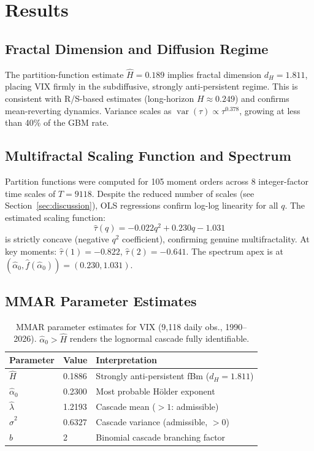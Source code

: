 \documentclass[12pt,a4paper]{article}
\begin{document}
\section{Results}

\subsection{Fractal Dimension and Diffusion Regime}

The partition-function estimate $\hat{H} = 0.189$ implies fractal
dimension $d_H = 1.811$, placing VIX firmly in the subdiffusive,
strongly anti-persistent regime. This is consistent with R/S-based
estimates (long-horizon $H \approx 0.249$) and confirms mean-reverting
dynamics. Variance scales as $\operatorname{var}(\tau) \propto
\tau^{0.378}$, growing at less than 40\% of the GBM rate.

\subsection{Multifractal Scaling Function and Spectrum}

Partition functions were computed for 105 moment orders across 8
integer-factor time scales of $T = 9118$. Despite the reduced number
of scales (see Section~\ref{sec:discussion}), OLS regressions confirm
log-log linearity for all $q$. The estimated scaling function:
\begin{equation}
  \hat{\tau}(q) = -0.022q^2 + 0.230q - 1.031
  \label{eq:tau-estimated}
\end{equation}
is strictly concave (negative $q^2$ coefficient), confirming genuine
multifractality. At key moments: $\hat{\tau}(1) = -0.822$,
$\hat{\tau}(2) = -0.641$. The spectrum apex is at
$(\hat{\alpha}_0, \hat{f}(\hat{\alpha}_0)) = (0.230, 1.031)$.

\subsection{MMAR Parameter Estimates}

\begin{table}[h!]
\centering
\begin{tabular}{llp{7cm}}
\toprule
\textbf{Parameter} & \textbf{Value} & \textbf{Interpretation} \\
\midrule
$\hat{H}$ & 0.1886 & Strongly anti-persistent fBm ($d_H = 1.811$) \\
$\hat{\alpha}_0$ & 0.2300 & Most probable H\"{o}lder exponent \\
$\hat{\lambda}$ & 1.2193 & Cascade mean ($> 1$: admissible) \\
$\hat{\sigma}^2$ & $0.6327$ & Cascade variance (admissible, $> 0$) \\
$b$ & 2 & Binomial cascade branching factor \\
\bottomrule
\end{tabular}
\caption{MMAR parameter estimates for VIX (9,118 daily obs.,
  1990--2026). $\hat{\alpha}_0 > \hat{H}$ renders the lognormal
  cascade fully identifiable.}
\label{tab:params}
\end{table}
\end{document}

